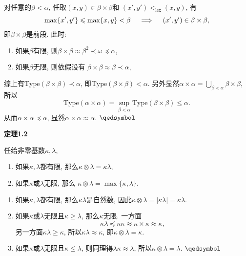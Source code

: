 对任意的$\beta<\alpha$, 任取$(x,y)\in\beta\times\beta$和
$(x',y')<_{\mathrm{lex}}(x,y)$, 有
\vspace{3pt}
\[
    \max\{x',y'\}\leqslant\max\{x,y\}<\beta
    \quad\implies\quad(x',y')\in\beta\times\beta,\\[3pt]
\]
即$\beta\times\beta$是前段. 此时:
\begin{enumerate}
    \item 如果$\beta$有限,
    则$\beta\times\beta\approx\beta^2\prec\omega\preccurlyeq\alpha$,
    \item 如果$\beta$无限, 则依假设有
    $\beta\times\beta\approx\beta\prec\alpha$,
\end{enumerate}
综上有$\mathrm{Type}(\beta\times\beta)\prec\alpha$,
即$\mathrm{Type}(\beta\times\beta)<\alpha$.
另外显然$\displaystyle\alpha\times\alpha=
\bigcup_{\beta<\alpha}\beta\times\beta$, 所以
\vspace{3pt}
\[
    \mathrm{Type}(\alpha\times\alpha)=
    \sup_{\beta<\alpha}\mathrm{Type}(\beta\times\beta)\leqslant\alpha.
\]
从而$\alpha\times\alpha\preccurlyeq\alpha$,
显然$\alpha\times\alpha\approx\alpha$. \hfill $\qedsymbol$





\newpage

\hypertarget{sec:定理1.2}{}
\noindent\textbf{定理1.2}

任给非零基数$\kappa,\lambda$,
\begin{enumerate}
    \item 如果$\kappa,\lambda$都有限, 那么$\kappa\otimes\lambda=\kappa\lambda$,
    \item 如果$\kappa$或$\lambda$无限, 那么
    $\kappa\otimes\lambda=\max\{\kappa,\lambda\}$.
\end{enumerate}


\begin{enumerate}
    \item 如果$\kappa,\lambda$都有限, 那么$\kappa\lambda$是自然数,
    因此$\kappa\otimes\lambda=|\kappa\lambda|=\kappa\lambda$.
    \item 如果$\kappa$或$\lambda$无限且$\kappa\geqslant\lambda$,
    那么$\kappa$无限. 一方面
    \[
        \kappa\lambda\preccurlyeq\kappa\kappa\approx
        \kappa\times\kappa\approx\kappa,
    \]
    另一方面$\kappa\lambda\geqslant\kappa$, 所以$\kappa\lambda\approx\kappa$,
    即$\kappa\otimes\lambda=\kappa$.
    
    \item 如果$\kappa$或$\lambda$无限且$\kappa\leqslant\lambda$,
    则同理得$\lambda\kappa\approx\lambda$, 所以$\kappa\otimes\lambda=\lambda$.
    \hfill $\qedsymbol$
\end{enumerate}

